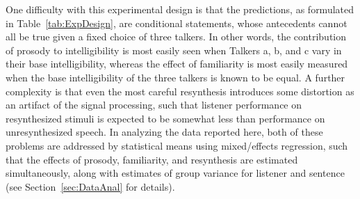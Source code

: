 One difficulty with this experimental design is that the predictions, as formulated in Table~\ref{tab:ExpDesign}, are conditional statements, whose antecedents cannot all be true given a fixed choice of three talkers.  In other words, the contribution of prosody to intelligibility is most easily seen when Talkers \ac{a}, \ac{b}, and \ac{c} vary in their base intelligibility, whereas the effect of familiarity is most easily measured when the base intelligibility of the three talkers is known to be equal.  A further complexity is that even the most careful resynthesis introduces some distortion as an artifact of the signal processing, such that listener performance on resynthesized stimuli is expected to be somewhat less than performance on unresynthesized speech.  In analyzing the data reported here, both of these problems are addressed by statistical means using mixed\-/effects regression, such that the effects of prosody, familiarity, and resynthesis are estimated simultaneously, along with estimates of group variance for listener and sentence (see Section~\ref{sec:DataAnal} for details).



